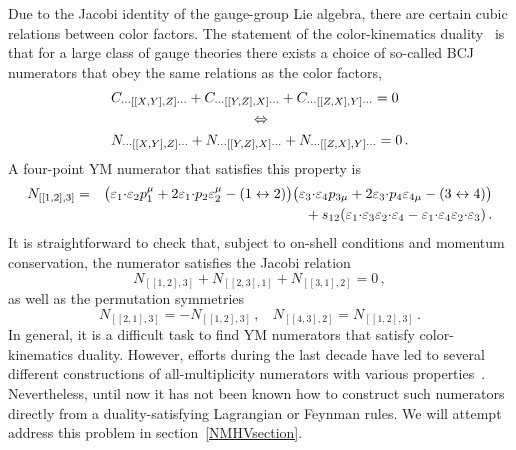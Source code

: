 \documentclass[11pt,a4paper]{article}
\begin{document}
Due to the Jacobi identity of the gauge-group Lie algebra, there are certain cubic relations between color factors. The statement of the color-kinematics duality~\cite{Bern:2008qj, Bern:2010ue} is that for a large class of gauge theories there exists a choice of so-called BCJ numerators that obey the same relations as the color factors,
\begin{align} \label{JacobiId}
    &C_{\cdots[[X,Y],Z]\cdots} + C_{\cdots[[Y,Z],X]\cdots}+ C_{\cdots[[Z,X],Y]\cdots} = 0 \nonumber \\ & \hskip 3.5cm \Leftrightarrow \notag \\
    &N_{\cdots[[X,Y],Z]\cdots} +  N_{\cdots[[Y,Z],X]\cdots}+ N_{\cdots[[Z,X],Y]\cdots} = 0 \, .
\end{align}
%
A four-point YM numerator that satisfies this property is~\cite{Bern:2019prr}
\begin{eqnarray}\label{four_point_numerator}
N_{[[1,2],3]} &=&
\big(\varepsilon_1{\cdot}\varepsilon_2 p_1^\mu + 2 \varepsilon_1{\cdot}p_2 \varepsilon_2^\mu -(1\leftrightarrow 2)\big)
\big(\varepsilon_3{\cdot}\varepsilon_4 p_{3\mu} + 2 \varepsilon_3{\cdot}p_4 \varepsilon_{4\mu} -(3\leftrightarrow 4)\big)\nonumber\\
&& \null +s_{12} (\varepsilon_1{\cdot} \varepsilon_3 \varepsilon_2{\cdot} \varepsilon_4-\varepsilon_1{\cdot} \varepsilon_4 \varepsilon_2{\cdot} \varepsilon_3)\,.
\end{eqnarray}
It is straightforward to check that, subject to on-shell conditions and momentum conservation, the numerator satisfies the Jacobi relation
\begin{equation}
N_{[[1,2],3]}+N_{[[2,3],1]}+N_{[[3,1],2]}=0\,,
\end{equation}
as well as the permutation symmetries
\begin{equation}
N_{[[2,1],3]}=-N_{[[1,2],3]}\,,~~~~ N_{[[4,3],2]}=N_{[[1,2],3]}\,.
\end{equation}
In general, it is a difficult task to find YM numerators that satisfy color-kinematics duality. However, efforts during the last decade have led to several different constructions of all-multiplicity numerators with various properties~\cite{BjerrumBohr:2010hn,Mafra:2011kj,Mafra:2015vca,Bjerrum-Bohr:2016axv,Du:2017kpo,Chen:2017bug,Edison:2020ehu,Bjerrum-Bohr:2020syg, Hou:2021mvg,Cheung:2021zvb,Brandhuber:2021bsf, Ahmadiniaz:2021ayd,Brandhuber:2022enp}. Nevertheless, until now it has not been known how to construct such numerators directly from a duality-satisfying Lagrangian or Feynman rules. We will attempt address this problem in section~\ref{NMHVsection}.
\end{document}
